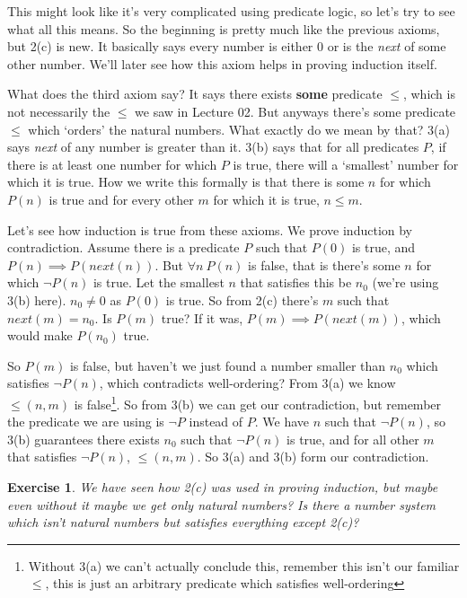 \documentclass[a4paper,10pt]{article}
\newtheorem{exercise}{Exercise}[section]
\theoremstyle{definition} %
\begin{document}
    This might look like it's very complicated using predicate logic, so let's try to see
    what all this means. So the beginning is pretty much like the previous axioms, but 2(c)
    is new. It basically says every number is either 0 or is the \emph{next} of some other number.
    We'll later see how this axiom helps in proving induction itself.

    What does the third axiom say? It says there exists \textbf{some} predicate $\leq$, which 
    is not necessarily the $\leq$ we saw in Lecture 02. But anyways there's some predicate
    $\leq$ which `orders' the natural numbers. What exactly do we mean by that? 3(a) says
    \emph{next} of any number is greater than it. 3(b) says that for all predicates $P$, if
    there is at least one number for which $P$ is true, there will a `smallest' number for
    which it is true. How we write this formally is that there is some $n$ for which $P(n)$ is
    true and for every other $m$ for which it is true, $n \leq m$.

    Let's see how induction is true from these axioms. We prove induction by contradiction.
    Assume there is a predicate $P$ such that $P(0)$ is true, and $P(n) \implies P(next(n))$.
    But $\forall n \ P(n)$ is false, that is there's some $n$ for which $\lnot P(n)$ is true.
    Let the smallest $n$ that satisfies this be $n_0$ (we're using 3(b) here).
    $n_0 \neq 0$ as $P(0)$ is true. So from 2(c) there's $m$ such that $next(m) = n_0$.
    Is $P(m)$ true? If it was, $P(m) \implies P(next(m))$, which would make $P(n_0)$ true.

    So $P(m)$ is false, but haven't we just found a number smaller than $n_0$ which satisfies
    $\lnot P(n)$, which contradicts well-ordering? From 3(a) we know $\leq(n, m)$ is false\footnote
    {Without 3(a) we can't actually conclude this, remember this isn't our familiar
    $\leq$, this is just an arbitrary predicate which satisfies well-ordering}.
    So from 3(b) we can get our contradiction, but remember the predicate we are using is 
    $\lnot P$ instead of $P$. We have $n$ such that $\lnot P(n)$, so 3(b) guarantees
    there exists $n_0$ such that $\lnot P(n)$ is true, and for all other $m$ that
    satisfies $\lnot P(n)$, $\leq(n,m)$. So 3(a) and 3(b) form our contradiction.

    \begin{exercise}
        We have seen how 2(c) was used in proving induction, but maybe even without it
        maybe we get only natural numbers? Is there a number system which isn't natural numbers
        but satisfies everything except 2(c)?
    \end{exercise}
\end{document}
